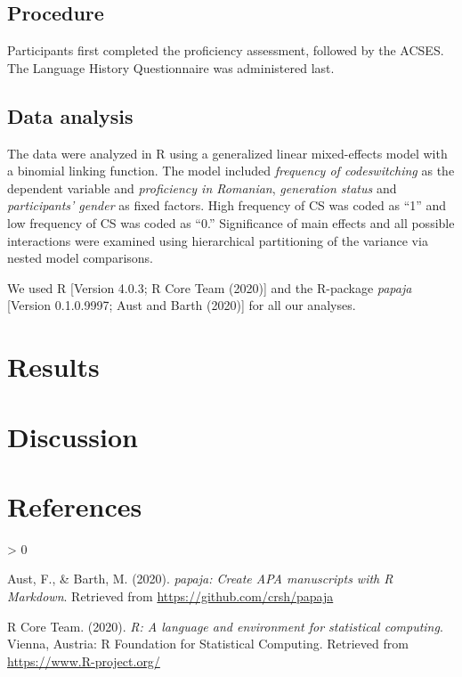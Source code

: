 \documentclass[
  english,
  man]{apa6}
\newlength{\cslhangindent}
\newenvironment{CSLReferences}[2] %
 {%
  \setlength{\parindent}{0pt}
  \ifodd #1 \everypar{\setlength{\hangindent}{\cslhangindent}}\ignorespaces\fi
  \ifnum #2 > 0
  \setlength{\parskip}{#2\baselineskip}
  \fi
 }%
 {}
\begin{document}
\hypertarget{procedure}{%
\subsection{Procedure}\label{procedure}}

Participants first completed the proficiency assessment, followed by the ACSES. The Language History Questionnaire was administered last.

\hypertarget{data-analysis}{%
\subsection{Data analysis}\label{data-analysis}}

The data were analyzed in R using a generalized linear mixed-effects model with a binomial linking function. The model included \emph{frequency of codeswitching} as the dependent variable and \emph{proficiency in Romanian}, \emph{generation status} and \emph{participants' gender} as fixed factors. High frequency of CS was coded as ``1'' and low frequency of CS was coded as ``0.'' Significance of main effects and all possible interactions were examined using hierarchical partitioning of the variance via nested model comparisons.

We used R {[}Version 4.0.3; R Core Team (2020){]} and the R-package \emph{papaja} {[}Version 0.1.0.9997; Aust and Barth (2020){]} for all our analyses.

\hypertarget{results}{%
\section{Results}\label{results}}

\hypertarget{discussion}{%
\section{Discussion}\label{discussion}}

\newpage

\hypertarget{references}{%
\section{References}\label{references}}

\begingroup
\setlength{\parindent}{-0.5in}
\setlength{\leftskip}{0.5in}

\hypertarget{refs}{}
\begin{CSLReferences}{1}{0}
\leavevmode\hypertarget{ref-R-papaja}{}%
Aust, F., \& Barth, M. (2020). \emph{{papaja}: {Create} {APA} manuscripts with {R Markdown}}. Retrieved from \url{https://github.com/crsh/papaja}

\leavevmode\hypertarget{ref-R-base}{}%
R Core Team. (2020). \emph{R: A language and environment for statistical computing}. Vienna, Austria: R Foundation for Statistical Computing. Retrieved from \url{https://www.R-project.org/}

\end{CSLReferences}

\endgroup
\end{document}
